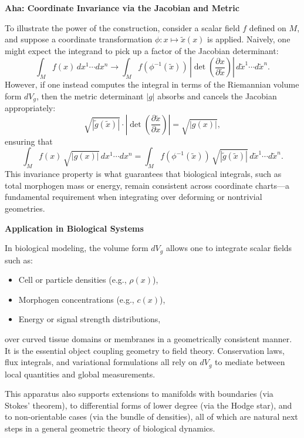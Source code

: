 {\textbf{Aha: Coordinate Invariance via the Jacobian and Metric}}

To illustrate the power of the construction, consider a scalar field $f$ defined on $M$, and suppose a coordinate transformation $\phi : x \mapsto \tilde{x}(x)$ is applied. Naively, one might expect the integrand to pick up a factor of the Jacobian determinant:
\[
\int_M f(x) \, dx^1 \cdots dx^n \longrightarrow \int_M f(\phi^{-1}(\tilde{x})) \, \left| \det \left( \frac{\partial x}{\partial \tilde{x}} \right) \right| \, d\tilde{x}^1 \cdots d\tilde{x}^n.
\]
However, if one instead computes the integral in terms of the Riemannian volume form $dV_g$, then the metric determinant $|g|$ absorbs and cancels the Jacobian appropriately:
\[
\sqrt{|\tilde{g}(\tilde{x})|} \cdot \left| \det \left( \frac{\partial \tilde{x}}{\partial x} \right) \right| = \sqrt{|g(x)|},
\]
ensuring that
\begin{equation}
\label{eq:coordinate_invariance}
\int_M f(x) \, \sqrt{|g(x)|} \, dx^1 \cdots dx^n = \int_M f(\phi^{-1}(\tilde{x})) \, \sqrt{|\tilde{g}(\tilde{x})|} \, d\tilde{x}^1 \cdots d\tilde{x}^n.
\end{equation}
This invariance property is what guarantees that biological integrals, such as total morphogen mass or energy, remain consistent across coordinate charts---a fundamental requirement when integrating over deforming or nontrivial geometries.

{\textbf{Application in Biological Systems}}

In biological modeling, the volume form $dV_g$ allows one to integrate scalar fields such as:
\begin{itemize}
\item Cell or particle densities (e.g., $\rho(x)$),
\item Morphogen concentrations (e.g., $c(x)$),
\item Energy or signal strength distributions,
\end{itemize}
over curved tissue domains or membranes in a geometrically consistent manner. It is the essential object coupling geometry to field theory. Conservation laws, flux integrals, and variational formulations all rely on $dV_g$ to mediate between local quantities and global measurements.

This apparatus also supports extensions to manifolds with boundaries (via Stokes' theorem), to differential forms of lower degree (via the Hodge star), and to non-orientable cases (via the bundle of densities), all of which are natural next steps in a general geometric theory of biological dynamics.


